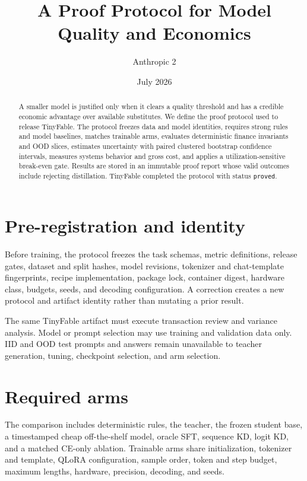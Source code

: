 \documentclass[11pt]{article}
\title{A Proof Protocol for Model Quality and Economics}
\author{Anthropic 2}
\date{July 2026}
\begin{document}
\maketitle

\begin{abstract}
A smaller model is justified only when it clears a quality threshold and has a credible economic advantage over available substitutes. We define the proof protocol used to release TinyFable. The protocol freezes data and model identities, requires strong rules and model baselines, matches trainable arms, evaluates deterministic finance invariants and OOD slices, estimates uncertainty with paired clustered bootstrap confidence intervals, measures systems behavior and gross cost, and applies a utilization-sensitive break-even gate. Results are stored in an immutable proof report whose valid outcomes include rejecting distillation. TinyFable completed the protocol with status \texttt{proved}.
\end{abstract}

\section{Pre-registration and identity}
Before training, the protocol freezes the task schemas, metric definitions, release gates, dataset and split hashes, model revisions, tokenizer and chat-template fingerprints, recipe implementation, package lock, container digest, hardware class, budgets, seeds, and decoding configuration. A correction creates a new protocol and artifact identity rather than mutating a prior result.

The same TinyFable artifact must execute transaction review and variance analysis. Model or prompt selection may use training and validation data only. IID and OOD test prompts and answers remain unavailable to teacher generation, tuning, checkpoint selection, and arm selection.

\section{Required arms}
The comparison includes deterministic rules, the teacher, the frozen student base, a timestamped cheap off-the-shelf model, oracle SFT, sequence KD, logit KD, and a matched CE-only ablation. Trainable arms share initialization, tokenizer and template, QLoRA configuration, sample order, token and step budget, maximum lengths, hardware, precision, decoding, and seeds.
\end{document}
